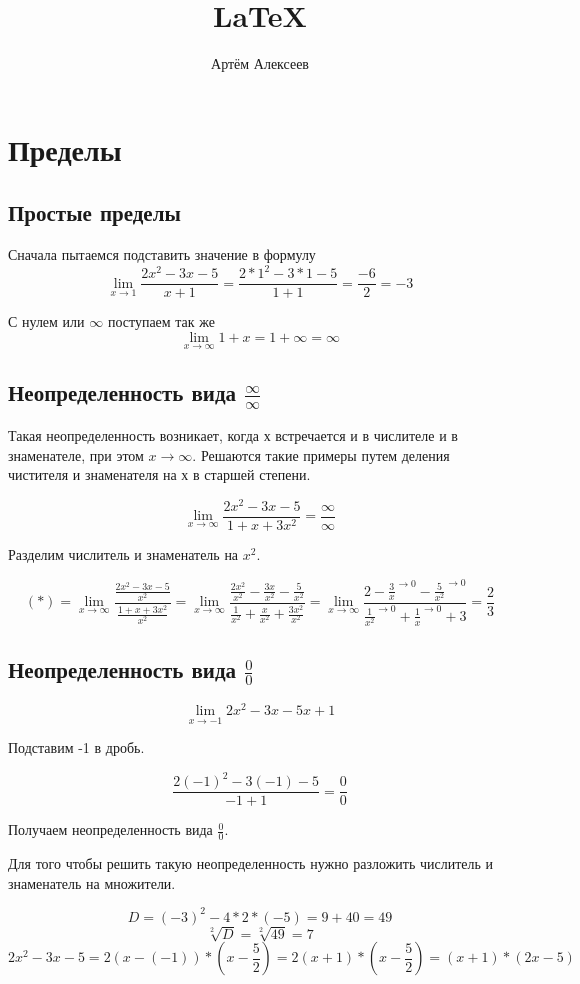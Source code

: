 \documentclass[12pt,a4paper]{article}
\title{\LaTeX}
\date{}
\author{Артём Алексеев}
\begin{document}
  

\section{Пределы}
\subsection{Простые пределы}

Сначала пытаемся подставить значение в формулу
$$\lim_{x \to 1}\frac{2x^2-3x-5}{x+1} = \frac{2*1^2-3*1-5}{1+1} = \frac{-6}{2} = -3$$

С нулем или $\infty$ поступаем так же
$$\lim_{x \to \infty}1+x = 1 + \infty = \infty$$

\subsection{Неопределенность вида $\frac{\infty}{\infty}$}

Такая неопределенность возникает, когда х встречается и в числителе и в знаменателе, при этом $x \to \infty$.
Решаются такие примеры путем деления чистителя и знаменателя на х в старшей степени.

$$\lim_{x \to \infty}\frac{2x^2-3x-5}{1+x+3x^2} = \frac{\infty}{\infty}$$

Разделим числитель и знаменатель на $x^2$.

$$(*) 
= \lim_{x \to \infty}\frac{\frac{2x^2-3x-5}{x^2}}{\frac{1+x+3x^2}{x^2}}
= \lim_{x \to \infty}\frac{\frac{2x^2}{x^2}-\frac{3x}{x^2}-\frac{5}{x^2}}{\frac{1}{x^2} + \frac{x}{x^2} + \frac{3x^2}{x^2}}
= \lim_{x \to \infty}\frac{2-\frac{3}{x}^{\to 0}-\frac{5}{x^2}^{\to 0}}{\frac{1}{x^2}^{\to 0} + \frac{1}{x}^{\to 0} + 3}
= \frac{2}{3}
$$

\subsection{Неопределенность вида $\frac{0}{0}$}

$$\lim_{x \to -1}{2x^2-3x-5}{x+1}$$

Подставим -1 в дробь.

$$\frac{2(-1)^2-3(-1)-5}{-1+1}=\frac{0}{0}$$

Получаем неопределенность вида $\frac{0}{0}$. 

Для того чтобы решить такую неопределенность нужно разложить числитель и знаменатель на множители.

$$ D = (-3)^2-4*2*(-5) = 9+40 = 49 $$
$$ \sqrt[2]{D} = \sqrt[2]{49} = 7 $$
$$ 2x^2-3x-5=2(x-(-1))*(x-\frac{5}{2})=2(x+1)*(x-\frac{5}{2})=(x+1)*(2x-5) $$
\end{document}
